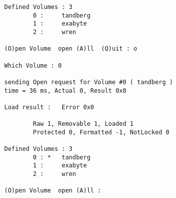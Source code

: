 \begin{screendump}
  \begin{verbatim}
   Defined Volumes : 3
           0 :     tandberg
           1 :     exabyte
           2 :     wren

   (O)pen Volume  open (A)ll  (Q)uit : o

   Which Volume : 0

   sending Open request for Volume #0 ( tandberg )
   time = 36 ms, Actual 0, Result 0x0

   Load result :   Error 0x0

           Raw 1, Removable 1, Loaded 1
           Protected 0, Formatted -1, NotLocked 0

   Defined Volumes : 3
           0 : *   tandberg
           1 :     exabyte
           2 :     wren

   (O)pen Volume  open (A)ll :
  \end{verbatim}
\end{screendump}
